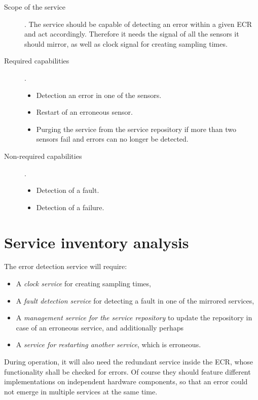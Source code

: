 \begin{description}
\item [Scope of the service].
The service should be capable of detecting an error within a given ECR and act accordingly. Therefore it needs the signal of all the sensors it should mirror, as well as clock signal for creating sampling times.
\item [Required capabilities].
	\begin{itemize}
	\item Detection an error in one of the sensors.
	\item Restart of an erroneous sensor.
	\item Purging the service from the service repository if more than two sensors fail and errors can no longer be detected.
	\end{itemize}
\item [Non-required capabilities].
	\begin{itemize}
	\item Detection of a fault.
	\item Detection of a failure.
	\end{itemize}
\end{description}



\section{Service inventory analysis}


The error detection service will require:
\begin{itemize}
\item A \emph{clock service} for creating sampling times,
\item A \emph{fault detection service} for detecting a fault in one of the mirrored services,
\item A \emph{management service for the service repository} to update the repository in case of an erroneous service, and additionally perhaps
\item A \emph{service for restarting another service}, which is erroneous.
\end{itemize}

During operation, it will also need the redundant service inside the ECR, whose functionality shall be checked for errors. Of course they should feature different implementations on independent hardware components, so that an error could not emerge in multiple services at the same time.


